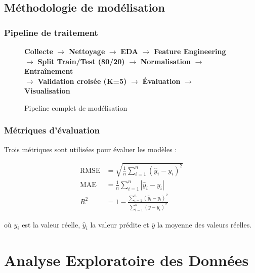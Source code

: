 \documentclass[a4paper,12pt]{report}
\begin{document}
\section{M\'ethodologie de mod\'elisation}

\subsection{Pipeline de traitement}

\begin{figure}[H]
\centering
\begin{tcolorbox}[colback=ecamblue!5, colframe=ecamblue!50, arc=4pt, width=0.85\textwidth]
\centering
\textbf{Collecte} $\longrightarrow$ \textbf{Nettoyage} $\longrightarrow$ \textbf{EDA} $\longrightarrow$ \textbf{Feature Engineering}\\[6pt]
$\longrightarrow$ \textbf{Split Train/Test (80/20)} $\longrightarrow$ \textbf{Normalisation} $\longrightarrow$ \textbf{Entra\^inement}\\[6pt]
$\longrightarrow$ \textbf{Validation crois\'ee (K=5)} $\longrightarrow$ \textbf{\'Evaluation} $\longrightarrow$ \textbf{Visualisation}
\end{tcolorbox}
\caption{Pipeline complet de mod\'elisation}
\end{figure}

\subsection{M\'etriques d'\'evaluation}

Trois m\'etriques sont utilis\'ees pour \'evaluer les mod\`eles :

\begin{align}
\text{RMSE} &= \sqrt{\frac{1}{n}\sum_{i=1}^{n}(\hat{y}_i - y_i)^2} \label{eq:rmse}\\[6pt]
\text{MAE}  &= \frac{1}{n}\sum_{i=1}^{n}|\hat{y}_i - y_i| \label{eq:mae}\\[6pt]
R^2         &= 1 - \frac{\sum_{i=1}^{n}(\hat{y}_i - y_i)^2}{\sum_{i=1}^{n}(\bar{y} - y_i)^2} \label{eq:r2}
\end{align}

o\`u $y_i$ est la valeur r\'eelle, $\hat{y}_i$ la valeur pr\'edite et $\bar{y}$ la moyenne des valeurs r\'eelles.

\newpage
\chapter{Analyse Exploratoire des Donn\'ees}
\end{document}
